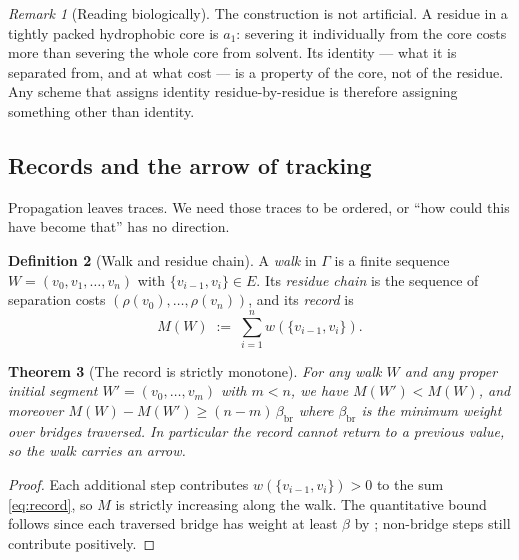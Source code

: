 \documentclass[11pt,twocolumn,a4paper]{article}
\theoremstyle{thmstyle}
\newtheorem{theorem}{Theorem}[section]
\theoremstyle{definition}
\newtheorem{definition}[theorem]{Definition}
\theoremstyle{remark}
\newtheorem{remark}[theorem]{Remark}
\newcommand{\Gph}{\Gamma}
\newcommand{\E}{E}
\newcommand{\wt}{w}
\newcommand{\flo}{\beta}
\newcommand{\res}{\rho}
\newcommand{\rec}{M}
\newcommand{\Walk}{W}
\begin{document}
\begin{remark}[Reading  biologically]
The construction is not artificial. A residue in a tightly packed
hydrophobic core is $a_1$: severing it individually from the core
costs more than severing the whole core from solvent. Its identity ---
what it is separated from, and at what cost --- is a property of the
core, not of the residue. Any scheme that assigns identity
residue-by-residue is therefore assigning something other than
identity.
\end{remark}

\subsection{Records and the arrow of tracking}

Propagation leaves traces. We need those traces to be ordered, or
``how could this have become that'' has no direction.

\begin{definition}[Walk and residue chain]
\label{def:walk}
A \emph{walk} in $\Gph$ is a finite sequence
$\Walk = (v_0, v_1, \dots, v_n)$ with $\{v_{i-1},v_i\} \in \E$. Its
\emph{residue chain} is the sequence of separation costs
$(\res(v_0), \dots, \res(v_n))$, and its \emph{record} is
\begin{equation}
  \rec(\Walk) \;:=\; \sum_{i=1}^{n} \wt(\{v_{i-1}, v_i\}).
  \label{eq:record}
\end{equation}
\end{definition}

\begin{theorem}[The record is strictly monotone]
\label{thm:monotone}
For any walk $\Walk$ and any proper initial segment
$\Walk' = (v_0,\dots,v_m)$ with $m < n$, we have
$\rec(\Walk') < \rec(\Walk)$, and moreover
$\rec(\Walk) - \rec(\Walk') \geq (n-m)\,\flo_{\mathrm{br}}$ where
$\flo_{\mathrm{br}}$ is the minimum weight over bridges traversed. In
particular the record cannot return to a previous value, so the walk
carries an arrow.
\end{theorem}

\begin{proof}
Each additional step contributes $\wt(\{v_{i-1},v_i\}) > 0$ to the sum
\eqref{eq:record}, so $\rec$ is strictly increasing along the walk.
The quantitative bound follows since each traversed bridge has weight
at least $\flo$ by ; non-bridge steps still contribute
positively.
\end{proof}
\end{document}
